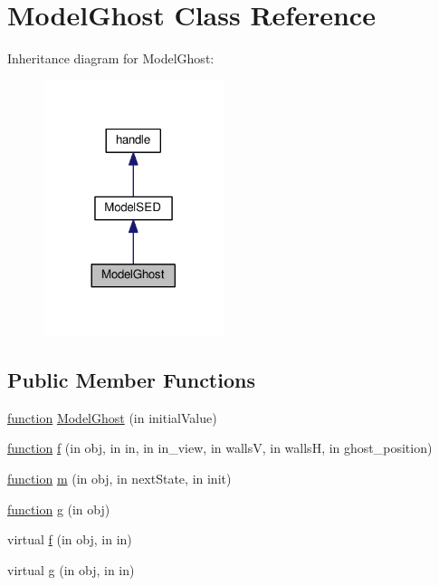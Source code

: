 \hypertarget{class_model_ghost}{}\section{Model\+Ghost Class Reference}
\label{class_model_ghost}


Inheritance diagram for Model\+Ghost\+:
\nopagebreak
\begin{figure}[H]
\begin{center}
\leavevmode
\includegraphics[width=149pt]{class_model_ghost__inherit__graph}
\end{center}
\end{figure}
\subsection*{Public Member Functions}
\begin{DoxyCompactItemize}
\item 
\hyperlink{_plan__desuma_functions__2_players_8m_ac2ffb26d6f42d3bbcd7847b0873403f4}{function} \hyperlink{class_model_ghost_a0eb9a8f9771bba8a091d35339af59343}{Model\+Ghost} (in initial\+Value)
\item 
\hyperlink{_plan__desuma_functions__2_players_8m_ac2ffb26d6f42d3bbcd7847b0873403f4}{function} \hyperlink{class_model_ghost_a3643512eacb95c58d0678b6a76176101}{f} (in obj, in in, in in\+\_\+view, in wallsV, in wallsH, in ghost\+\_\+position)
\item 
\hyperlink{_plan__desuma_functions__2_players_8m_ac2ffb26d6f42d3bbcd7847b0873403f4}{function} \hyperlink{class_model_ghost_a3140f24c6c4b80037b7d4f521c6ae2d3}{m} (in obj, in next\+State, in init)
\item 
\hyperlink{_plan__desuma_functions__2_players_8m_ac2ffb26d6f42d3bbcd7847b0873403f4}{function} \hyperlink{class_model_ghost_a07dadfabe92bf9a144b8a862720e7746}{g} (in obj)
\item 
virtual \hyperlink{class_model_s_e_d_ac36f9451c43b120828af4380858f2024}{f} (in obj, in in)
\item 
virtual \hyperlink{class_model_s_e_d_a2d53b5f665cfcf64d482bbfa8a6eb098}{g} (in obj, in in)
\end{DoxyCompactItemize}
